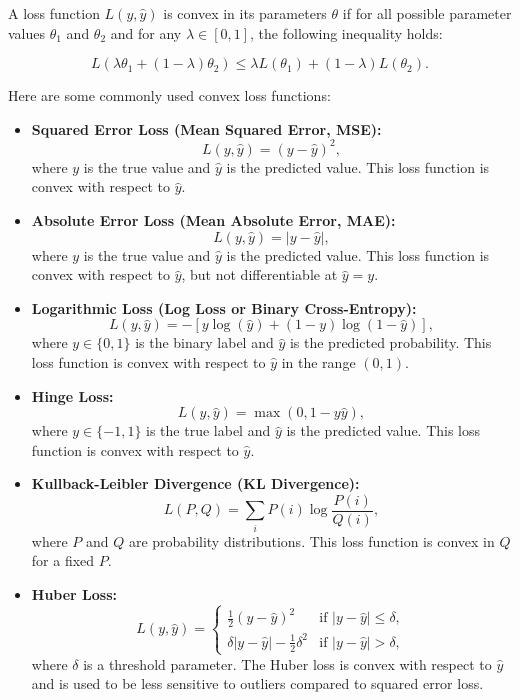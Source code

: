 A loss function \( L(y, \hat{y}) \) is convex in its parameters \( \theta \) if for all possible parameter values \( \theta_1 \) and \( \theta_2 \) and for any \( \lambda \in [0, 1] \), the following inequality holds:

\[
L(\lambda \theta_1 + (1 - \lambda) \theta_2) \leq \lambda L(\theta_1) + (1 - \lambda) L(\theta_2).
\]

Here are some commonly used convex loss functions:

\begin{itemize}
  \item \textbf{Squared Error Loss (Mean Squared Error, MSE):} 
  \[
  L(y, \hat{y}) = (y - \hat{y})^2,
  \]
  where \( y \) is the true value and \( \hat{y} \) is the predicted value. This loss function is convex with respect to \( \hat{y} \).

  \item \textbf{Absolute Error Loss (Mean Absolute Error, MAE):}
  \[
  L(y, \hat{y}) = |y - \hat{y}|,
  \]
  where \( y \) is the true value and \( \hat{y} \) is the predicted value. This loss function is convex with respect to \( \hat{y} \), but not differentiable at \( \hat{y} = y \).

  \item \textbf{Logarithmic Loss (Log Loss or Binary Cross-Entropy):}
  \[
  L(y, \hat{y}) = - \left[ y \log(\hat{y}) + (1 - y) \log(1 - \hat{y}) \right],
  \]
  where \( y \in \{0, 1\} \) is the binary label and \( \hat{y} \) is the predicted probability. This loss function is convex with respect to \( \hat{y} \) in the range \( (0, 1) \).

  \item \textbf{Hinge Loss:}
  \[
  L(y, \hat{y}) = \max(0, 1 - y \hat{y}),
  \]
  where \( y \in \{-1, 1\} \) is the true label and \( \hat{y} \) is the predicted value. This loss function is convex with respect to \( \hat{y} \).

  \item \textbf{Kullback-Leibler Divergence (KL Divergence):}
  \[
  L(P, Q) = \sum_{i} P(i) \log \frac{P(i)}{Q(i)},
  \]
  where \( P \) and \( Q \) are probability distributions. This loss function is convex in \( Q \) for a fixed \( P \).

  \item \textbf{Huber Loss:}
  \[
  L(y, \hat{y}) = \begin{cases}
  \frac{1}{2}(y - \hat{y})^2 & \text{if } |y - \hat{y}| \leq \delta, \\
  \delta |y - \hat{y}| - \frac{1}{2}\delta^2 & \text{if } |y - \hat{y}| > \delta,
  \end{cases}
  \]
  where \( \delta \) is a threshold parameter. The Huber loss is convex with respect to \( \hat{y} \) and is used to be less sensitive to outliers compared to squared error loss.
\end{itemize}